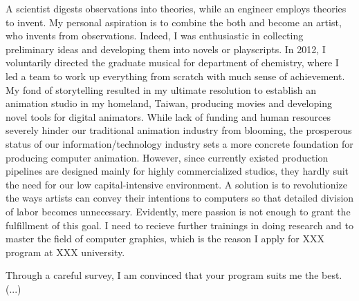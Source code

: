 \documentclass[a4paper, 12pt]{article}
\begin{document}


A scientist digests observations into theories, while an engineer employs theories to invent. My personal aspiration is to combine the both and become an artist, who invents from observations. Indeed, I was enthusiastic in collecting preliminary ideas and developing them into novels or playscripts. In 2012, I voluntarily directed the graduate musical for department of chemistry, where I led a team to work up everything from scratch with much sense of achievement. My fond of storytelling resulted in my ultimate resolution to establish an animation studio in my homeland, Taiwan, producing movies and developing novel tools for digital animators. While lack of funding and human resources severely hinder our traditional animation industry from blooming, the prosperous status of our information/technology industry sets a more concrete foundation for producing computer animation. However, since currently existed production pipelines are designed mainly for highly commercialized studios, they hardly suit the need for our low capital-intensive environment. A solution is to revolutionize the ways artists can convey their intentions to computers so that detailed division of labor becomes unnecessary. Evidently, mere passion is not enough to grant the fulfillment of this goal. I need to recieve further trainings in doing research and to master the field of computer graphics, which is the reason I apply for XXX program at XXX university.


Through a careful survey, I am convinced that your program suits me the best. (...)\\
\end{document}
